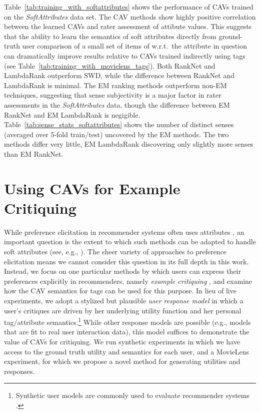 \documentclass[manuscript,screen,nonacm]{acmart}
\newcommand{\1}{{\mathbf 1}}
\theoremstyle{TheoremNum}
\begin{document}
Table~\ref{tab:training_with_softattributes} shows the performance of CAVs trained on the \emph{SoftAttributes} data set.
%
The CAV methods show highly positive correlation between the learned CAVs and rater assessment of attibute values. This suggests that the ability to learn the semantics of soft attributes directly from ground-truth user comparison of a small set of items of w.r.t.\ the attribute in question can dramatically improve results relative to CAVs trained indirectly using tags (see Table~\ref{tab:training_with_movielens_tags}). Both RankNet and LambdaRank outperform SWD, while the difference between RankNet and LambdaRank is minimal. 
The EM ranking methods outperform non-EM techniques, suggesting that sense subjectivity is a major factor in rater assessments in the \emph{SoftAttributes} data, though the difference between EM RankNet and EM LambdaRank is negigible.
Table~\ref{tab:sense_stats_softattributes} shows the number of distinct senses (averaged over 5-fold train/test) uncovered by the EM methods. The two methods differ very little, EM LambdaRank discovering only slightly more senses than EM RankNet.



\section{Using CAVs for Example Critiquing}
\label{sec:critiquing}



While preference elicitation in recommender systems often uses attributes \cite{pu:AIM2008,viappiani:nips2010,bonilla_sanner:nips10}, an important question is the extent to which such methods can 
be adapted to handle soft attributes (see, e.g., \cite{radlinski:sdd2019}).
The sheer variety of approaches to preference elicitation means we cannot consider this question in its full depth in this work. Instead, we focus on one particular methods by which users can express their preferences explicitly in recommenders, namely \emph{example critiquing} \cite{chen_critiquing_survey:umuai2012},
and examine how the CAV semantics for tags can be used for this purpose.
In lieu of live experiments, we adopt a stylized but plausible \emph{user response model} in which a user's critiques are driven by her underlying utility function and her personal tag/attribute semantics.\footnote{Synthetic user models are commonly used to evaluate recommender systems \cite{zou:neurips20,aliexpress:tkde21}.}
While other response models are possible (e.g., models that are fit to real user interaction data), this model suffices to demonstrate the value of CAVs for critiquing. We run synthetic experiments in which we have access to the ground truth utility and semantics for each user, and a MovieLens experiment, for which we propose a novel method for generating utilities and responses.
\end{document}
